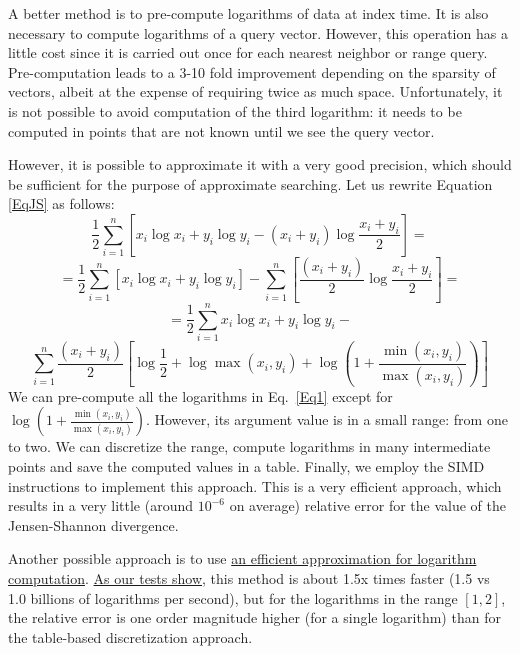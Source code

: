 \documentclass[runningheads,a4paper]{llncs}
\begin{document}
{A better method is to pre-compute logarithms of data at index time. 
It is also necessary to compute logarithms of a query vector.
However, this operation has a little cost since it is carried out once 
for each nearest neighbor or range query.
Pre-computation leads to a 3-10 fold improvement depending on the sparsity of vectors,
albeit at the expense of requiring twice as much space.
Unfortunately, it is not possible to avoid computation of the third logarithm:
it needs to be computed in points that are not known until we see the query vector.

However, it is possible to approximate it with a very good precision,
which should be sufficient for the purpose of approximate searching.
Let us rewrite Equation \ref{EqJS} as follows:
$$
\frac{1}{2}\sum_{i=1}^n\left[ x_i \log x_i + y_i \log y_i  -(x_i+y_i)\log \frac{x_i +y_i}{2}\right]=
$$
$$
 = \frac{1}{2}\sum_{i=1}^n\left[ x_i \log x_i + y_i \log y_i\right]  -
\sum_{i=1}^n\left[\frac{(x_i+y_i)}{2}\log \frac{x_i +y_i}{2} \right]=
$$
$$
 = \frac{1}{2}\sum_{i=1}^n x_i \log x_i + y_i \log y_i  -
$$
\begin{equation}\label{Eq1}
\sum_{i=1}^n\frac{(x_i+y_i)}{2}\left[\log\frac{1}{2} + \log \max(x_i,y_i) + 
\log \left(1 + \frac{\min(x_i,y_i)}{\max(x_i,y_i)}\right) \right]
\end{equation}
We can pre-compute all the logarithms in Eq.~\ref{Eq1} except for $\log \left(1 + \frac{\min(x_i,y_i)}{\max(x_i,y_i)}\right) $. However, its argument value is in a small range: from one to two.
We can discretize the range, compute logarithms in many intermediate points and save the computed values in a table.
Finally, we employ the SIMD instructions to implement this approach. 
This is a very efficient approach, which results in a very little (around $10^{-6}$ on average) relative error for the value of the Jensen-Shannon divergence.

Another possible approach is to use \href{http://fastapprox.googlecode.com/svn/trunk/fastapprox/src/fastonebigheader.h}{an efficient approximation for logarithm computation}.
\href{https://github.com/searchivarius/BlogCode/tree/master/2013/12/26}{As our tests show},
this method is about 1.5x times faster (1.5 vs 1.0 billions of logarithms per second),
but for the logarithms in the range $[1,2]$,
 the relative error is one order magnitude higher (for a single logarithm) than for the table-based discretization approach.

}
\end{document}
